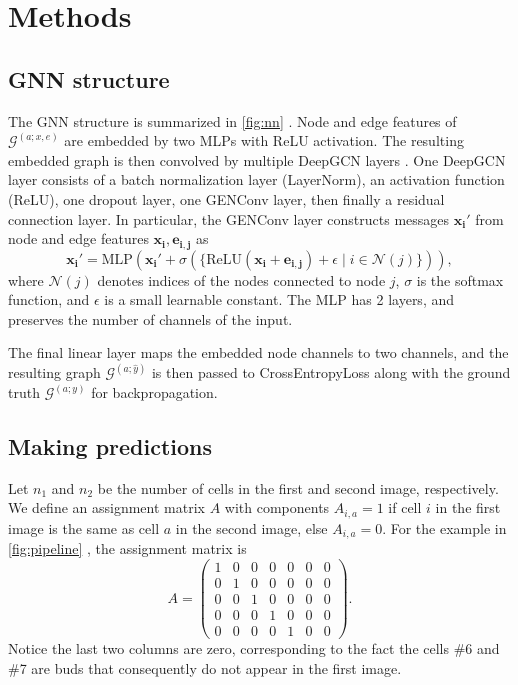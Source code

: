 \documentclass[10pt,conference,compsocconf,a4paper]{IEEEtran}
\newcommand{\G}{\mathcal{G}}
\renewcommand{\vec}[1]{\boldsymbol{#1}}
\newcommand*{\shortautoref}[1]{%
	\begingroup
	\def\equationautorefname{\textsc{Eq.}}%
	\def\tableautorefname{\textsc{Tab.}}%
	\def\figureautorefname{\textsc{Fig.}}%
	\autoref{#1}%
	\endgroup
}
\begin{document}
\section{Methods}

	\subsection{GNN structure}

		The GNN structure is summarized in \shortautoref{fig:nn}. Node and edge features of $\G^{(a;x,e)}$ are embedded by two MLPs with ReLU activation. The resulting embedded graph is then convolved by multiple DeepGCN layers \cite{li_deepergcn_2020}. One DeepGCN layer consists of a batch normalization layer (LayerNorm), an activation function (ReLU), one dropout layer, one GENConv layer, then finally a residual connection layer. In particular, the GENConv layer constructs messages $\vec{x_i}'$ from node and edge features $\vec{x_i}, \vec{e_{i,j}}$ as
		$$
			\vec{x_i}' = \textrm{MLP}(\vec{x_i}' + \sigma(\{\textrm{ReLU}(\vec{x_i} + \vec{e_{i,j}}) + \epsilon \;|\; i \in \mathcal{N}(j)\})),
		$$
		where $\mathcal{N}(j)$ denotes indices of the nodes connected to node $j$, $\sigma$ is the softmax function, and $\epsilon$ is a small learnable constant. The $\textrm{MLP}$ has 2 layers, and preserves the number of channels of the input.

		The final linear layer maps the embedded node channels to two channels, and the resulting graph $\G^{(a;\hat y)}$ is then passed to CrossEntropyLoss along with the ground truth $\G^{(a;y)}$ for backpropagation.

	\subsection{Making predictions} \label{sec:methods:pred}

		Let $n_1$ and $n_2$ be the number of cells in the first and second image, respectively. We define an assignment matrix $A$ with components $A_{i,a} = 1$ if cell $i$ in the first image is the same as cell $a$ in the second image, else $A_{i,a} = 0$. For the example in \shortautoref{fig:pipeline}, the assignment matrix is
		$$
			A = \begin{pmatrix}
				1 & 0 & 0 & 0 & 0 & 0 & 0 \\
				0 & 1 & 0 & 0 & 0 & 0 & 0 \\
				0 & 0 & 1 & 0 & 0 & 0 & 0 \\
				0 & 0 & 0 & 1 & 0 & 0 & 0 \\
				0 & 0 & 0 & 0 & 1 & 0 & 0
			\end{pmatrix}.
		$$
		Notice the last two columns are zero, corresponding to the fact the cells \#6 and \#7 are buds that consequently do not appear in the first image.
\end{document}
